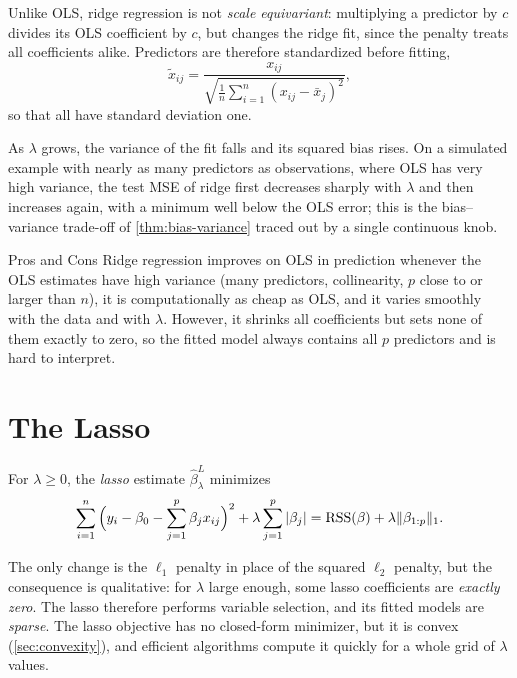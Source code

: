 Unlike OLS, ridge regression is not \emph{scale equivariant}: multiplying a predictor by $c$ divides its OLS coefficient by $c$, but changes the ridge fit, since the penalty treats all coefficients alike. Predictors are therefore standardized before fitting,
\[
\tilde x_{ij}=\frac{x_{ij}}{\sqrt{\frac1n\sum_{i=1}^n(x_{ij}-\bar x_j)^2}},
\]
so that all have standard deviation one.

As $\lambda$ grows, the variance of the fit falls and its squared bias rises. On a simulated example with nearly as many predictors as observations, where OLS has very high variance, the test MSE of ridge first decreases sharply with $\lambda$ and then increases again, with a minimum well below the OLS error; this is the bias--variance trade-off of \cref{thm:bias-variance} traced out by a single continuous knob.

\begin{notebox}{Pros and Cons}
Ridge regression improves on OLS in prediction whenever the OLS estimates have high variance (many predictors, collinearity, $p$ close to or larger than $n$), it is computationally as cheap as OLS, and it varies smoothly with the data and with $\lambda$. However, it shrinks all coefficients but sets none of them exactly to zero, so the fitted model always contains all $p$ predictors and is hard to interpret.
\end{notebox}

\section{The Lasso}\label{sec:lasso}

\begin{definition}[Lasso]\label{def:lasso}
For $\lambda\ge0$, the \emph{lasso} estimate $\hat\beta^L_\lambda$ minimizes
\[
\sum_{i=1}^n\Big(y_i-\beta_0-\sum_{j=1}^p\beta_jx_{ij}\Big)^2+\lambda\sum_{j=1}^p|\beta_j|=\mathrm{RSS}(\beta)+\lambda\lVert \beta_{1:p}\rVert_1 .
\]
\end{definition}

The only change is the $\ell_1$ penalty in place of the squared $\ell_2$ penalty, but the consequence is qualitative: for $\lambda$ large enough, some lasso coefficients are \emph{exactly zero}. The lasso therefore performs variable selection, and its fitted models are \emph{sparse}. The lasso objective has no closed-form minimizer, but it is convex (\cref{sec:convexity}), and efficient algorithms compute it quickly for a whole grid of $\lambda$ values.


